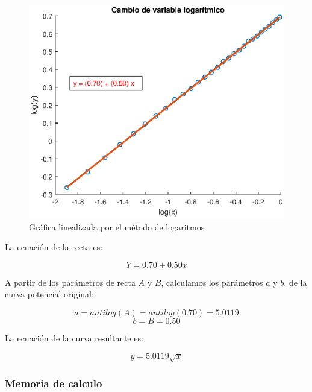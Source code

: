 \documentclass[letter,11pt]{article}
\begin{document}
\begin{figure}[!h]
\centering
\includegraphics[scale=1.00]{eps/practica34_2.eps}
\caption{Gráfica linealizada por el método de logaritmos}
\label{practica34_2}
\end{figure}

La ecuación de la recta es:

\begin{equation}
    Y = 0.70 + 0.50 x
\end{equation}

A partir de los parámetros de recta $A$ y $B$, calculamos los parámetros $a$ y
$b$, de la curva potencial original:

\begin{equation*}
    a = antilog(A) = antilog(0.70) = 5.0119
\end{equation*}
\begin{equation*}
    b = B = 0.50
\end{equation*}

La ecuación de la curva resultante es:

\begin{equation}
    y = 5.0119 \sqrt{x}
\end{equation}

\subsubsection{Memoria de calculo}
\end{document}
